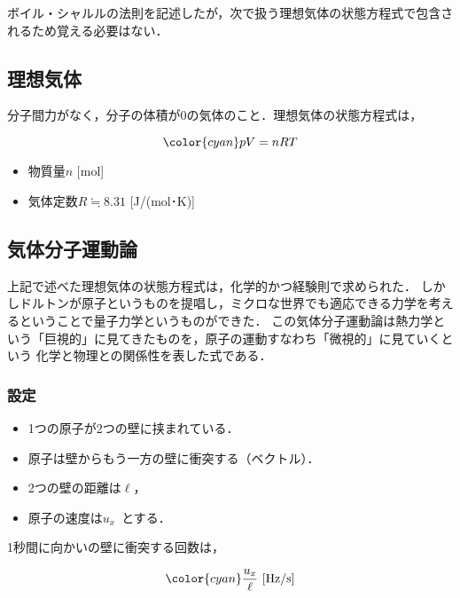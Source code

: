 \documentclass[a4paper,11pt]{ltjsarticle}
\begin{document}
ボイル・シャルルの法則を記述したが，次で扱う理想気体の状態方程式で包含されるため覚える必要はない．

\subsection{理想気体}

分子間力がなく，分子の体積が0の気体のこと．理想気体の状態方程式は，

\begin{equation*}
    {\color{cyan} pV = nRT}
\end{equation*}

\begin{itemize}
    \item 物質量$n$ [mol]
    \item 気体定数$R \fallingdotseq 8.31$ [J/(mol･K)]
\end{itemize}

\clearpage

\subsection{気体分子運動論}

上記で述べた理想気体の状態方程式は，化学的かつ経験則で求められた．
しかしドルトンが原子というものを提唱し，ミクロな世界でも適応できる力学を考えるということで量子力学というものができた．
この気体分子運動論は熱力学という「巨視的」に見てきたものを，原子の運動すなわち「微視的」に見ていくという
化学と物理との関係性を表した式である．

\subsubsection*{設定}

\begin{itemize}
    \item 1つの原子が2つの壁に挟まれている．
    \item 原子は壁からもう一方の壁に衝突する（ベクトル）．
    \item 2つの壁の距離は$\ell$，
    \item 原子の速度は$u_x$\ とする．
\end{itemize}

1秒間に向かいの壁に衝突する回数は，

\begin{equation*}
    {\color{cyan} \dfrac{u_x}{\ell}\ \mathrm{[Hz/s]}}
\end{equation*}
\end{document}
